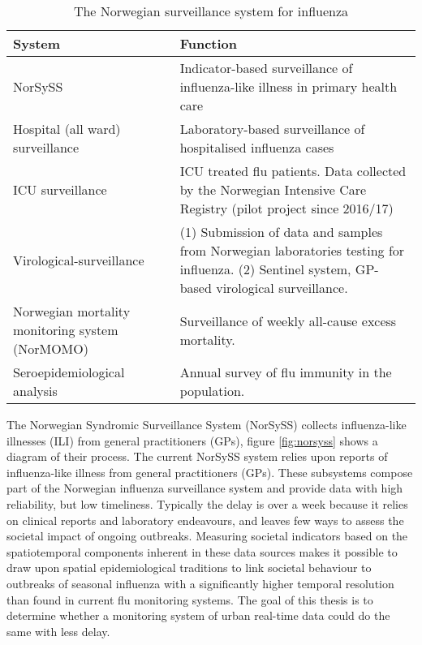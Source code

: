\begin{center}
\begin{table}
\begin{tabular}{ | m{9em} | m{10cm}| }
 \hline
 \textbf{System} & \textbf{Function} \\ [0.5ex] 
 \hline
 NorSySS & Indicator-based surveillance of influenza-like illness in primary health care \\ 
  \hline
 Hospital (all ward) surveillance  & Laboratory-based surveillance of hospitalised influenza cases \\[5ex]
  \hline
 ICU surveillance & ICU treated flu patients. Data collected by the Norwegian Intensive Care Registry (pilot project since 2016/17) \\
  \hline
 Virological-surveillance & (1) Submission of data and samples from Norwegian laboratories testing for influenza.
(2) Sentinel system, GP-based virological surveillance. \\[5ex]
  \hline
 Norwegian mortality monitoring system (NorMOMO) & Surveillance of weekly all-cause excess mortality. \\[5ex]
 \hline
 Seroepidemiological analysis & Annual survey of flu immunity in the population. \\ [5ex] 
 \hline
\end{tabular}
\caption{The Norwegian surveillance system for influenza}
 \label{table:1}
\end{table}
\end{center}

The Norwegian Syndromic Surveillance System (NorSySS) collects influenza-like illnesses (ILI) from general practitioners (GPs)\cite{NorSySS}, figure \ref{fig:norsyss} shows a diagram of their process. The current NorSySS system relies upon reports of influenza-like illness from general practitioners (GPs).  These subsystems compose part of the Norwegian influenza surveillance system and provide data with high reliability, but low timeliness. Typically the delay is over a week because it relies on clinical reports and laboratory endeavours, and leaves few ways to assess the societal impact of ongoing outbreaks. Measuring societal indicators based on the spatiotemporal components inherent in these data sources makes it possible to draw upon spatial epidemiological traditions to link societal behaviour to outbreaks of seasonal influenza with a significantly higher temporal resolution than found in current flu monitoring systems. The goal of this thesis is to determine whether a monitoring system of urban real-time data could do the same with less delay.

